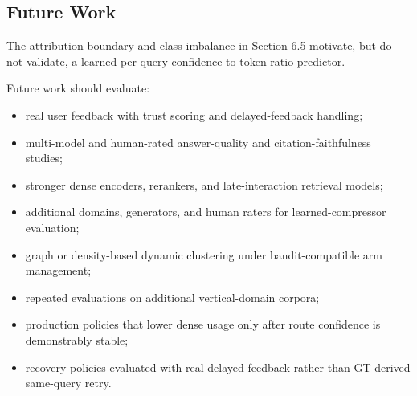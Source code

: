 \subsection{Future Work}
\label{sec:08-limitations:future-work}

The attribution boundary and class imbalance in Section 6.5 motivate, but do not validate, a learned per-query confidence-to-token-ratio predictor.

Future work should evaluate:

\begin{itemize}
\item real user feedback with trust scoring and delayed-feedback handling;
\item multi-model and human-rated answer-quality and citation-faithfulness studies;
\item stronger dense encoders, rerankers, and late-interaction retrieval models;
\item additional domains, generators, and human raters for learned-compressor evaluation;
\item graph or density-based dynamic clustering under bandit-compatible arm management;
\item repeated evaluations on additional vertical-domain corpora;
\item production policies that lower dense usage only after route confidence is demonstrably stable;
\item recovery policies evaluated with real delayed feedback rather than GT-derived same-query retry.
\end{itemize}
